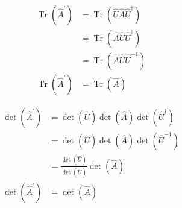 \documentclass{article}
\begin{document}
\begin{align*}
    \operatorname{Tr}\left(\hat{A}^{\prime}\right)&=\operatorname{Tr}\left(\hat{U}\hat{A}\hat{U}^\dagger\right)\\
    &=\operatorname{Tr}\left(\hat{A}\hat{U}\hat{U}^\dagger\right)\\
    &=\operatorname{Tr}\left(\hat{A}\hat{U}\hat{U}^{-1}\right)\\
    \operatorname{Tr}\left(\hat{A}^{\prime}\right)&=\operatorname{Tr}\left(\hat{A}\right)
\end{align*}

\begin{align*}
    \operatorname{det}(\hat{A}^\prime) &= \operatorname{det}(\hat{U})\operatorname{det}(\hat{A})\operatorname{det}(\hat{U}^\dagger)\\
    &= \operatorname{det}(\hat{U})\operatorname{det}(\hat{A})\operatorname{det}(\hat{U}^{-1})\\
    &= \frac{\operatorname{det}(\hat{U})}{\operatorname{det}(\hat{U})}\operatorname{det}(\hat{A})\\
    \operatorname{det}\left(\hat{A}^{\prime}\right)&=\operatorname{det}\left(\hat{A}\right)
\end{align*}
\end{document}
